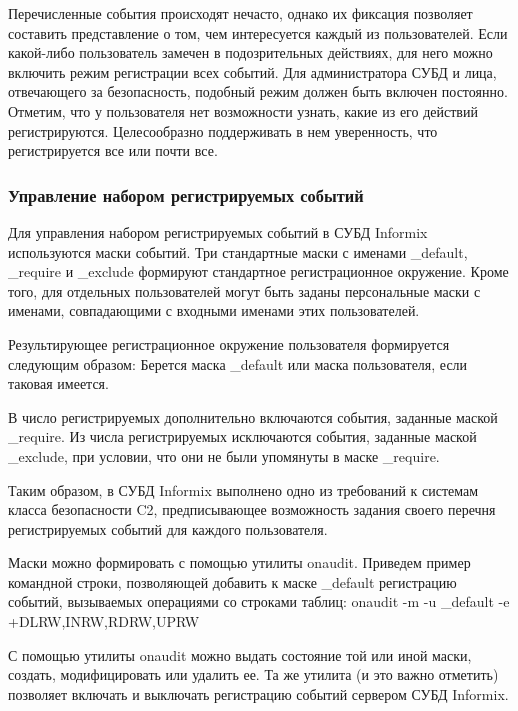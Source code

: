 Перечисленные события происходят нечасто, однако их фиксация позволяет составить представление о
том, чем интересуется каждый из пользователей. Если какой-либо пользователь замечен в
подозрительных действиях, для него можно включить режим регистрации всех событий. Для
администратора СУБД и лица, отвечающего за безопасность, подобный режим должен быть включен
постоянно.
Отметим, что у пользователя нет возможности узнать, какие из его действий регистрируются.
Целесообразно поддерживать в нем уверенность, что регистрируется все или почти все.


\subsubsection{Управление набором регистрируемых событий}
Для управления набором регистрируемых событий в СУБД Informix используются маски событий.
Три стандартные маски с именами \_default, \_require и \_exclude формируют стандартное
регистрационное окружение. Кроме того, для отдельных пользователей могут быть заданы персональные
маски с именами, совпадающими с входными именами этих пользователей.

Результирующее регистрационное окружение пользователя формируется следующим образом:
Берется маска \_default или маска пользователя, если таковая имеется.

В число регистрируемых дополнительно включаются события, заданные маской \_require.
Из числа регистрируемых исключаются события, заданные маской \_exclude, при условии, что они не
были упомянуты в маске \_require.

Таким образом, в СУБД Informix выполнено одно из требований к системам класса безопасности C2,
предписывающее возможность задания своего перечня регистрируемых событий для каждого пользователя.

Маски можно формировать с помощью утилиты onaudit. Приведем пример командной строки, позволяющей
добавить к маске \_default регистрацию событий, вызываемых операциями со строками таблиц:
onaudit -m -u \_default -e +DLRW,INRW,RDRW,UPRW

С помощью утилиты onaudit можно выдать состояние той или иной маски, создать, модифицировать или
удалить ее. Та же утилита (и это важно отметить) позволяет включать и выключать регистрацию событий
сервером СУБД Informix.


